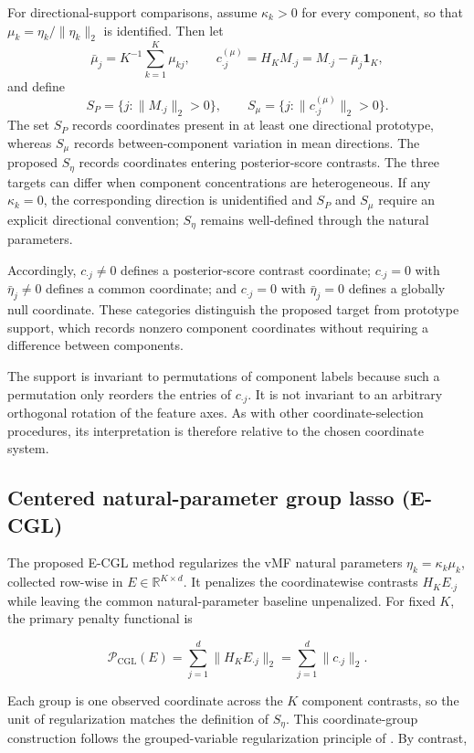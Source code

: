 \documentclass[preprint,12pt,authoryear]{elsarticle}
\begin{document}
For directional-support comparisons, assume $\kappa_k>0$ for every component,
so that $\mu_k=\eta_k/\lVert\eta_k\rVert_2$ is identified. Then let
\[
\bar\mu_j=K^{-1}\sum_{k=1}^{K}\mu_{kj},
\qquad
c_{\cdot j}^{(\mu)}
=H_KM_{\cdot j}
=M_{\cdot j}-\bar\mu_j\mathbf 1_K,
\]
and define
\[
S_P=\{j:\lVert M_{\cdot j}\rVert_2>0\},
\qquad
S_\mu=\{j:\lVert c_{\cdot j}^{(\mu)}\rVert_2>0\}.
\]
The set $S_P$ records coordinates present in at least one directional
prototype, whereas $S_\mu$ records between-component variation in mean
directions. The proposed $S_\eta$ records coordinates entering
posterior-score contrasts. The three targets can differ when component
concentrations are heterogeneous. If any $\kappa_k=0$, the corresponding
direction is unidentified and $S_P$ and $S_\mu$ require an explicit directional
convention; $S_\eta$ remains well-defined through the natural parameters.

Accordingly, $c_{\cdot j}\neq0$ defines a posterior-score contrast coordinate;
$c_{\cdot j}=0$ with $\bar\eta_j\neq0$ defines a common coordinate; and
$c_{\cdot j}=0$ with $\bar\eta_j=0$ defines a globally null coordinate.
These categories distinguish the proposed target from prototype support,
which records nonzero component coordinates without requiring a difference
between components.

The support is invariant to permutations of component labels because such a
permutation only reorders the entries of $c_{\cdot j}$. It is not invariant to
an arbitrary orthogonal rotation of the feature axes. As with other
coordinate-selection procedures, its interpretation is therefore relative to
the chosen coordinate system.

\subsection{Centered natural-parameter group lasso (E-CGL)}

The proposed E-CGL method regularizes the vMF natural parameters
$\eta_k=\kappa_k\mu_k$, collected row-wise in
$E\in\mathbb R^{K\times d}$. It penalizes the coordinatewise contrasts
$H_KE_{\cdot j}$ while leaving the common natural-parameter baseline
unpenalized. For fixed $K$, the primary penalty functional is

\[
\mathcal P_{\mathrm{CGL}}(E)
=\sum_{j=1}^d
\lVert H_KE_{\cdot j}\rVert_2
=\sum_{j=1}^d
\lVert c_{\cdot j}\rVert_2.
\]

Each group is one observed coordinate across the $K$ component contrasts, so
the unit of regularization matches the definition of $S_{\eta}$.
This coordinate-group construction follows the grouped-variable
regularization principle of \citet{yuan2006group}.
By contrast,
\end{document}
